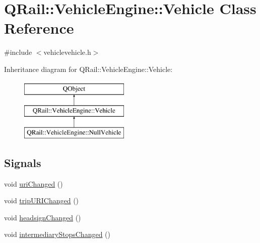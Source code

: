 \hypertarget{classQRail_1_1VehicleEngine_1_1Vehicle}{}\section{Q\+Rail\+::Vehicle\+Engine\+::Vehicle Class Reference}
\label{classQRail_1_1VehicleEngine_1_1Vehicle}


{\ttfamily \#include $<$vehiclevehicle.\+h$>$}

Inheritance diagram for Q\+Rail\+::Vehicle\+Engine\+::Vehicle\+:\begin{figure}[H]
\begin{center}
\leavevmode
\includegraphics[height=3.000000cm]{classQRail_1_1VehicleEngine_1_1Vehicle}
\end{center}
\end{figure}
\subsection*{Signals}
\begin{DoxyCompactItemize}
\item 
void \mbox{\hyperlink{classQRail_1_1VehicleEngine_1_1Vehicle_ac1b3292e6977df0f9a0e4d89b4d4c58c}{uri\+Changed}} ()
\item 
void \mbox{\hyperlink{classQRail_1_1VehicleEngine_1_1Vehicle_a9d8ff2ba6982a85ccd2c496be3f8e554}{trip\+U\+R\+I\+Changed}} ()
\item 
void \mbox{\hyperlink{classQRail_1_1VehicleEngine_1_1Vehicle_aac362c734b35bca681b2b6d8d8fdf92c}{headsign\+Changed}} ()
\item 
void \mbox{\hyperlink{classQRail_1_1VehicleEngine_1_1Vehicle_aae61eed8e5ab71602194a794fc05ff40}{intermediary\+Stops\+Changed}} ()
\end{DoxyCompactItemize}
